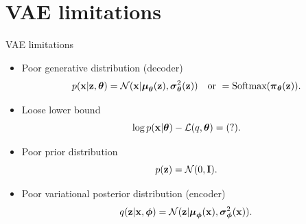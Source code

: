 \section{VAE limitations}
\begin{frame}{VAE limitations}
	\begin{itemize}
		\item Poor generative distribution (decoder)
		\[
		p(\mathbf{x} | \mathbf{z}, \boldsymbol{\theta}) = \mathcal{N}(\mathbf{x}| \boldsymbol{\mu}_{\boldsymbol{\theta}}(\mathbf{z}), \boldsymbol{\sigma}^2_{\boldsymbol{\theta}}(\mathbf{z})) \quad \text{or } = \text{Softmax}(\boldsymbol{\pi}_{\boldsymbol{\theta}}(\mathbf{z})).
		\]
		\item Loose lower bound
		\[
		\log p(\mathbf{x} | \boldsymbol{\theta}) - \mathcal{L}(q, \boldsymbol{\theta}) = (?).
		\]
		\item Poor prior distribution
		\[
		p(\mathbf{z}) = \mathcal{N}(0, \mathbf{I}).
		\]
		\item Poor variational posterior distribution (encoder)
		\[
		q(\mathbf{z} | \mathbf{x}, \boldsymbol{\phi}) = \mathcal{N}(\mathbf{z}| \boldsymbol{\mu}_{\boldsymbol{\phi}}(\mathbf{x}), \boldsymbol{\sigma}^2_{\boldsymbol{\phi}}(\mathbf{x})).
		\]
	\end{itemize}
\end{frame}
